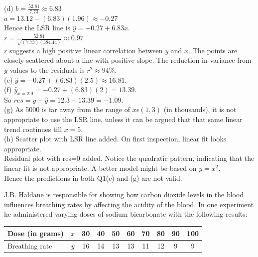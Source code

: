 \documentclass[bigtut]{tutorial}\usepackage[]{graphicx}\usepackage[]{color}
\begin{document}
\begin{tutorial}
\begin{questions}
\begin{solution}
(d) 
$b = \frac{52.81}{7.73} \approx 6.83$ \\
$a = 13.12 - (6.83)(1.96) \approx -0.27$ \\
Hence the LSR line is $\hat{y} = -0.27 + 6.83x$. \\
 
$r = \frac{52.81}{\sqrt{(7.73)(384.44)}} \approx 0.97$ \\

$r$ suggests a high positive linear correlation between $y$ and $x$. The points are closely scattered about a line with positive slope. The reduction in variance from $y$ values to the residuals is $r^2 \approx 94 \%$. \\

(e) 
$\hat{y} = -0.27 + (6.83)(2.5) \approx 16.81$.  \\

(f) 
$\hat{y}_{x=2.0} = -0.27 + (6.83)(2) =13.39$.\\
So $res = y - \hat{y} = 12.3-13.39 = -1.09$. \\

(g) 
  As 5000 is far away from the range of $x \epsilon (1,3)$ (in thousands), it is not appropriate to use the LSR line, unless it can be argued that that same linear trend continues till $x=5$.\\
  
(h)
Scatter plot with LSR line added. On first inspection, linear fit looks appropriate. \\
Residual plot with res=0 added.  Notice the quadratic pattern, indicating that the linear fit is not appropriate. A better model might be based on $y = x^2$.   \\
Hence the predictions in both Q1(e) and (g) are not valid.
\end{solution}




\question   
J.B. Haldane is responsible for showing how carbon dioxide levels in
the blood influences breathing rates by affecting the acidity of the blood.
 In one experiment he administered varying doses of sodium bicarbonate
with the following results:

        \begin{center}
            \begin{tabular}{| l | c | cccccccc |} \hline
            Dose (in grams) & $x$& 30&40&50&60&70&80&90&100 \\ \hline
            Breathing rate & $y$& 16 &14&13&13&11&12&9&9 \\ \hline
            \end{tabular}
        \end{center}


\end{questions}
\end{tutorial}
\end{document}
